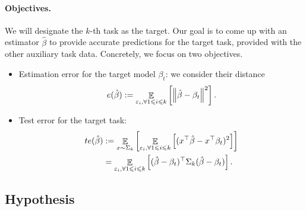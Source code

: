 \paragraph{Objectives.}
We will designate the $k$-th task as the target.
Our goal is to come up with an estimator $\hat{\beta}$ to provide accurate predictions for the target task, provided with the other auxiliary task data.
Concretely, we focus on two objectives.
\begin{itemize}
	\item Estimation error for the target model $\beta_t$: we consider their distance
		\[ e(\hat{\beta}) := \mathop{\mathbb{E}}_{\varepsilon_i, \forall 1\leqslant i\leqslant k}\left[ \left\| \hat{\beta} - \beta_t \right\|^2 \right]. \]
	\item Test error for the target task:
		\begin{align*}
			te(\hat{\beta}) &:= \mathop{\mathbb{E}}_{x \sim \Sigma_k}\left[ \mathop{\mathbb{E}}_{{\varepsilon_i, \forall 1\leqslant i\leqslant k}}\left[ (x^{\top}\hat{\beta} - x^{\top}\beta_t)^2 \right] \right] \\
			&= \mathop{\mathbb{E}}_{\varepsilon_i, \forall 1\leqslant i\leqslant k}\left[ (\hat{\beta} - \beta_t)^{\top}\Sigma_k(\hat{\beta} - \beta_t) \right].
		\end{align*}
\end{itemize}


\subsection{Hypothesis}

